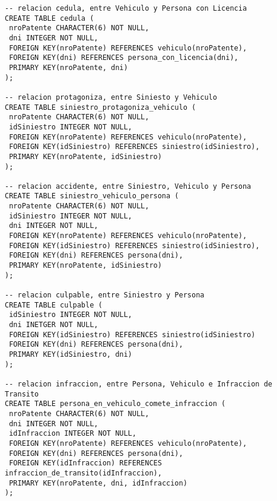 \begin{verbatim}
-- relacion cedula, entre Vehiculo y Persona con Licencia
CREATE TABLE cedula (
 nroPatente CHARACTER(6) NOT NULL,
 dni INTEGER NOT NULL,
 FOREIGN KEY(nroPatente) REFERENCES vehiculo(nroPatente),
 FOREIGN KEY(dni) REFERENCES persona_con_licencia(dni),
 PRIMARY KEY(nroPatente, dni)
);

-- relacion protagoniza, entre Siniesto y Vehiculo
CREATE TABLE siniestro_protagoniza_vehiculo (
 nroPatente CHARACTER(6) NOT NULL,
 idSiniestro INTEGER NOT NULL,
 FOREIGN KEY(nroPatente) REFERENCES vehiculo(nroPatente),
 FOREIGN KEY(idSiniestro) REFERENCES siniestro(idSiniestro),
 PRIMARY KEY(nroPatente, idSiniestro)
);

-- relacion accidente, entre Siniestro, Vehiculo y Persona
CREATE TABLE siniestro_vehiculo_persona (
 nroPatente CHARACTER(6) NOT NULL,
 idSiniestro INTEGER NOT NULL,
 dni INTEGER NOT NULL,
 FOREIGN KEY(nroPatente) REFERENCES vehiculo(nroPatente),
 FOREIGN KEY(idSiniestro) REFERENCES siniestro(idSiniestro),
 FOREIGN KEY(dni) REFERENCES persona(dni), 
 PRIMARY KEY(nroPatente, idSiniestro)
);

-- relacion culpable, entre Siniestro y Persona
CREATE TABLE culpable (
 idSiniestro INTEGER NOT NULL,
 dni INETGER NOT NULL,
 FOREIGN KEY(idSiniestro) REFERENCES siniestro(idSiniestro)
 FOREIGN KEY(dni) REFERENCES persona(dni),
 PRIMARY KEY(idSiniestro, dni)
);

-- relacion infraccion, entre Persona, Vehiculo e Infraccion de Transito
CREATE TABLE persona_en_vehiculo_comete_infraccion (
 nroPatente CHARACTER(6) NOT NULL,
 dni INTEGER NOT NULL,
 idInfraccion INTEGER NOT NULL,
 FOREIGN KEY(nroPatente) REFERENCES vehiculo(nroPatente),
 FOREIGN KEY(dni) REFERENCES persona(dni), 
 FOREIGN KEY(idInfraccion) REFERENCES infraccion_de_transito(idInfraccion), 
 PRIMARY KEY(nroPatente, dni, idInfraccion)
);
\end{verbatim}
